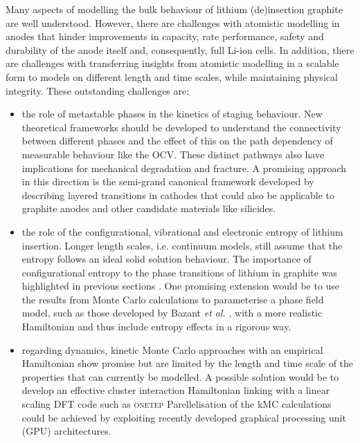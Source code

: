 \documentclass[../main.tex]{subfiles}
\begin{document}
Many aspects of modelling the bulk behaviour of lithium (de)insertion graphite are well understood. However, there are challenges with atomistic modelling in anodes that hinder improvements in capacity, rate performance, safety and durability of the anode itself and, consequently, full Li-ion cells. In addition, there are challenges with transferring insights from atomistic modelling in a scalable form to models on different length and time scales, while maintaining physical integrity. These outstanding challenges are:
    \begin{itemize}
        \item the role of metastable phases in the kinetics of staging behaviour. New theoretical frameworks should be developed to understand the connectivity between different phases and the effect of this on the path dependency of measurable behaviour like the OCV. These distinct pathways also have implications for mechanical degradation and fracture. A promising approach in this direction is the semi-grand canonical framework developed by \citeauthor{VanderVen2020} describing layered transitions in cathodes \cite{VanderVen2020,radin_role_2017,Vinck2016} that could also be applicable to graphite anodes and other candidate materials like silicides. 
        \item the role of the configurational, vibrational and electronic entropy of lithium insertion. Longer length scales, i.e. continuum models, still assume that the entropy follows an ideal solid solution behaviour. The importance of configurational entropy to the phase transitions of lithium in graphite was highlighted in previous sections \cite{Mercer2019,Mercer2021,REYNIER2003850}. One promising extension would be to use the results from Monte Carlo calculations to parameterise a phase field model, such as those developed by Bazant \textit{et al.} \cite{Bazant2017,guo2016,peng2011}, with a more realistic Hamiltonian and thus include entropy effects in a rigorous way.
        \item regarding dynamics, kinetic Monte Carlo approaches with an empirical Hamiltonian show promise \cite{gavilan-arriazu_kinetic_2020,gavilan-arriazu_effect_2020,GAVILANARRIAZU2018133} but are limited by the length and time scale of the properties that can currently be modelled. A possible solution would be to develop an effective cluster interaction Hamiltonian linking with a linear scaling DFT code such as \textsc{onetep} Parellelisation of the kMC calculations could be achieved by exploiting recently developed graphical processing unit (GPU) architectures.
    \end{itemize}
\end{document}
